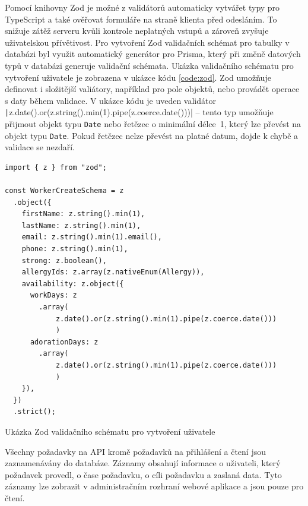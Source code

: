 Pomocí knihovny Zod je možné z validátorů automaticky vytvářet typy pro TypeScript a také ověřovat formuláře na straně klienta před odesláním.
To snižuje zátěž serveru kvůli kontrole neplatných vstupů a zároveň zvyšuje uživatelskou přívětivost.
Pro vytvoření Zod validačních schémat pro tabulky v databázi byl využit automatický generátor pro Prisma, který při změně datových typů v databázi
generuje validační schémata. Ukázka validačního schématu pro vytvoření uživatele je zobrazena v ukázce kódu \ref{code:zod}.
Zod umožňuje definovat i složitější valiátory, například pro pole objektů, nebo provádět operace s daty během validace.
V ukázce kódu je uveden validátor \texttt|z.date().or(z.string().min(1).pipe(z.coerce.date()))| -- tento typ umožňuje přijmout objekt typu \texttt{Date} nebo řetězec o minimální
délce~1, který lze převést na objekt typu \texttt{Date}. Pokud řetězec nelze převést na platné datum, dojde k chybě a validace se nezdaří.

\begin{listing}[h]
    \begin{verbatim}
import { z } from "zod";

const WorkerCreateSchema = z
  .object({
    firstName: z.string().min(1),
    lastName: z.string().min(1),
    email: z.string().min(1).email(),
    phone: z.string().min(1),
    strong: z.boolean(),
    allergyIds: z.array(z.nativeEnum(Allergy)),
    availability: z.object({
      workDays: z
        .array(
            z.date().or(z.string().min(1).pipe(z.coerce.date()))
            )
      adorationDays: z
        .array(
            z.date().or(z.string().min(1).pipe(z.coerce.date()))
            )
    }),
  })
  .strict();
    \end{verbatim}
    \caption{Ukázka Zod validačního schématu pro vytvoření uživatele}
    \label{code:zod}
\end{listing}

Všechny požadavky na API kromě požadavků na přihlášení a čtení jsou zaznamenávány do databáze. Záznamy obsahují informace o uživateli, který požadavek
provedl, o čase požadavku, o cíli požadavku a zaslaná data. Tyto záznamy lze zobrazit v administračním rozhraní webové aplikace a jsou pouze pro čtení.